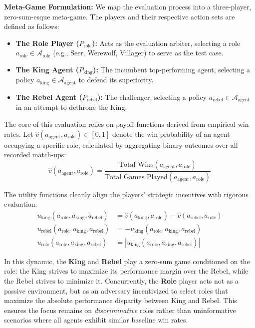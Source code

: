 \documentclass{article}
\begin{document}
\textbf{Meta-Game Formulation:}
We map the evaluation process into a three-player, zero-sum-esque meta-game. The players and their respective action sets are defined as follows:
\begin{itemize}
    \item \textbf{The Role Player ($P_{\text{role}}$):} Acts as the evaluation arbiter, selecting a role $a_{\text{role}} \in \mathcal{A}_{\text{role}}$ (e.g., Seer, Werewolf, Villager) to serve as the test case.
    \item \textbf{The King Agent ($P_{\text{king}}$):} The incumbent top-performing agent, selecting a policy $a_{\text{king}} \in \mathcal{A}_{\text{agent}}$ to defend its superiority.
    \item \textbf{The Rebel Agent ($P_{\text{rebel}}$):} The challenger, selecting a policy $a_{\text{rebel}} \in \mathcal{A}_{\text{agent}}$ in an attempt to dethrone the King.
\end{itemize}

The core of this evaluation relies on payoff functions derived from empirical win rates. Let $\hat{v}(a_{\text{agent}}, a_{\text{role}}) \in [0, 1]$ denote the win probability of an agent occupying a specific role, calculated by aggregating binary outcomes over all recorded match-ups:
$$ \hat{v}(a_{\text{agent}}, a_{\text{role}}) = \frac{\text{Total Wins}(a_{\text{agent}}, a_{\text{role}})}{\text{Total Games Played}(a_{\text{agent}}, a_{\text{role}})} $$

The utility functions cleanly align the players' strategic incentives with rigorous evaluation:
\begin{align*}
u_{\text{king}}(a_{\text{role}}, a_{\text{king}}, a_{\text{rebel}}) &= \hat{v}(a_{\text{king}}, a_{\text{role}}) - \hat{v}(a_{\text{rebel}}, a_{\text{role}}) \\
u_{\text{rebel}}(a_{\text{role}}, a_{\text{king}}, a_{\text{rebel}}) &= -u_{\text{king}}(a_{\text{role}}, a_{\text{king}}, a_{\text{rebel}}) \\
u_{\text{role}}(a_{\text{role}}, a_{\text{king}}, a_{\text{rebel}}) &= \left| u_{\text{king}}(a_{\text{role}}, a_{\text{king}}, a_{\text{rebel}}) \right|
\end{align*}

In this dynamic, the \textbf{King} and \textbf{Rebel} play a zero-sum game conditioned on the role: the King strives to maximize its performance margin over the Rebel, while the Rebel strives to minimize it. Concurrently, the \textbf{Role} player acts not as a passive environment, but as an adversary incentivized to select roles that maximize the absolute performance disparity between King and Rebel. This ensures the focus remains on \textit{discriminative} roles rather than uninformative scenarios where all agents exhibit similar baseline win rates.
\end{document}
